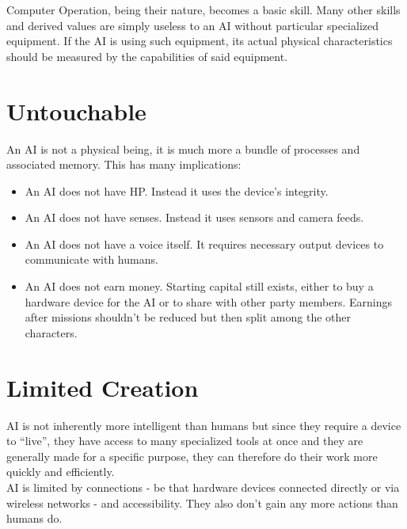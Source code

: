 \documentclass[12pt,a4paper,openany]{book}
\begin{document}
	Computer Operation, being their nature, becomes a basic skill. Many other skills and derived values are simply useless to an AI without particular specialized equipment. If the AI is using such equipment, its actual physical characteristics should be measured by the capabilities of said equipment.

	\chapter{Untouchable}
	An AI is not a physical being, it is much more a bundle of processes and associated memory. This has many implications:
	\vspace{-8mm}
	\begin{itemize}
		\setlength\itemsep{-8mm}
		\item An AI does not have HP. Instead it uses the device’s integrity.
		\item An AI does not have senses. Instead it uses sensors and camera feeds.
		\item An AI does not have a voice itself. It requires necessary output devices to communicate with humans.
		\item An AI does not earn money. Starting capital still exists, either to buy a hardware device for the AI or to share with other party members. Earnings after missions shouldn’t be reduced but then split among the other characters.
	\end{itemize}

	\chapter{Limited Creation}
	AI is not inherently more intelligent than humans but since they require a device to “live”, they have access to many specialized tools at once and they are generally made for a specific purpose, they can therefore do their work more quickly and efficiently.\\
	AI is limited by connections - be that hardware devices connected directly or via wireless networks - and accessibility. They also don’t gain any more actions than humans do.
\end{document}
